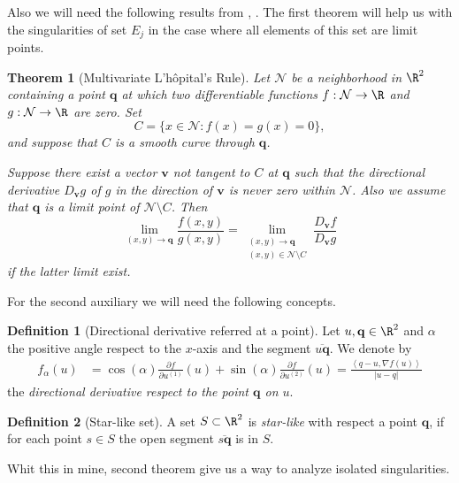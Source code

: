 \documentclass[3p]{elsarticle}
\theoremstyle{definition}
\newtheorem{dfn}{Definition}[section]
\theoremstyle{plain}%
\newtheorem{thm}{Theorem}[section]
\theoremstyle{remark}
\newcommand{\innerprod}[2]{\left\langle#1, #2\right\rangle}
\begin{document}
Also we will need the following results from \cite[Thm 2.1]{Lawlor2012}, \cite[Thm. 1]{FineAIandKass1966}.
The first theorem will help us  with the singularities of set $E_j$ in the case where all elements of this set
are limit points. 
\begin{thm}[Multivariate L'h\^{o}pital's Rule] \label{thm:Lawlor}
	Let $\mathcal{N}$ be a neighborhood in $\R^2$ containing a point $\mathbf{q}$ at which
	two differentiable functions $f:\mathcal{N}\to \R$ and $g:\mathcal{N}\to \R$ are zero.
	Set 
	$$
		C=\{x \in \mathcal{N}: f(x)=g(x)=0 \},
	$$
	and suppose that $C$ is a smooth curve through $\mathbf{q}$.
	
	Suppose	there exist a vector $\mathbf{v}$ not tangent to $C$ at $\mathbf{q}$
	such that the directional derivative $D_{\mathbf{v}}g$ of $g$ in the direction of $\mathbf{v}$ is never zero
	within $\mathcal{N}$. Also we assume that $\mathbf{q}$ is a limit point of $\mathcal{N}\setminus C$. Then
	\begin{equation*}
		\lim_{(x,y)\to \mathbf{q}}
		\frac{f(x,y)}{g(x,y)} =
		\lim_{
				\substack{
					(x,y)\to \mathbf{q}\\ 
					(x,y)\in \mathcal{N} \setminus C
				}
		}
		\frac{D_{\mathbf{v}} f }{D_{\mathbf{v}} g}
	\end{equation*}
	if the latter limit exist.
\end{thm}
For the second auxiliary we will need the following concepts.
\begin{dfn}[Directional derivative referred at a point]
	Let $u,\mathbf{q}\in \R^2$ and $\alpha$ the positive angle respect to the $x$-axis and the segment
	$\overline{u \mathbf{q}}$.	We denote by 
	\begin{align*}
		f_{\alpha}(u) &= 
			\cos(\alpha) 		
			\frac{\partial f}{\partial u^{(1)}}(u) + 
			\sin(\alpha)
			\frac{\partial f}{\partial u^{(2)}}(u) 
			= \frac{ \innerprod{q-u}{\nabla f(u)}}{|u-q|}			
	\end{align*}
	the \emph{directional derivative respect to the point $\mathbf{q}$ on $u$}.
\end{dfn}
\begin{dfn}[Star-like set]
	A set $S\subset \R^2$ is \emph{star-like} with respect a point $\mathbf{q}$, if for each point $s \in S$ the open 
	segment $\overline{s \mathbf{q}}$ is in $S$.
\end{dfn}
%
Whit this in mine, second theorem give us a way to analyze isolated singularities.
\end{document}

